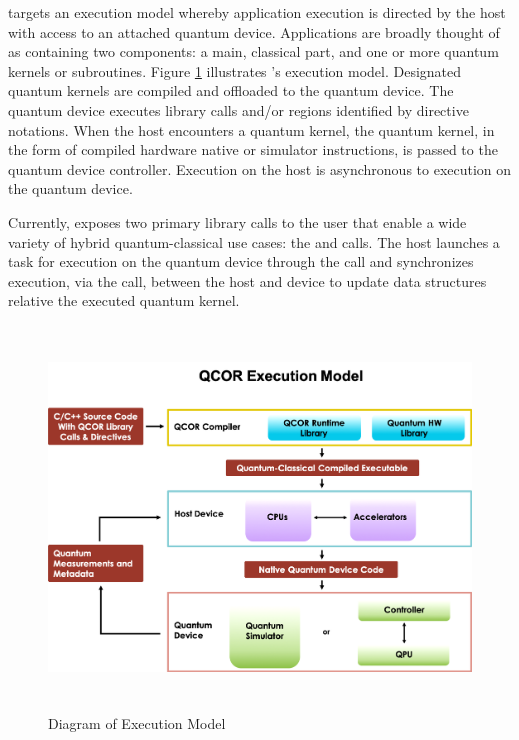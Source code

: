 \qcor targets an execution model whereby application execution is directed by the host with access to an attached quantum device. Applications are broadly thought of as containing two components: a main, classical part, and one or more quantum kernels or subroutines. Figure \ref{fig:exec_model} illustrates \qcor's execution model. Designated quantum kernels are compiled and offloaded to the quantum device. The quantum device executes \qcor library calls and/or \qcor regions identified by directive notations. When the host encounters a quantum kernel, the quantum kernel, in the form of compiled hardware native or simulator 
instructions, is passed to the quantum device controller. Execution on the host is asynchronous to execution on the quantum device. 

Currently, \qcor exposes two primary library calls to the user that enable a wide variety of hybrid quantum-classical use cases: the  and  calls. The host launches a task for execution on the quantum device through the  call and synchronizes execution, via the  call, between the host and device to update data structures relative the executed quantum kernel. 

\begin{figure}
 \centering
 \includegraphics[width=5in,height=4in]{figures/Execution_Model_Illustration_v3.png}
  \caption{Diagram of \qcor Execution Model}
  \label{fig:exec_model}
\end{figure}

